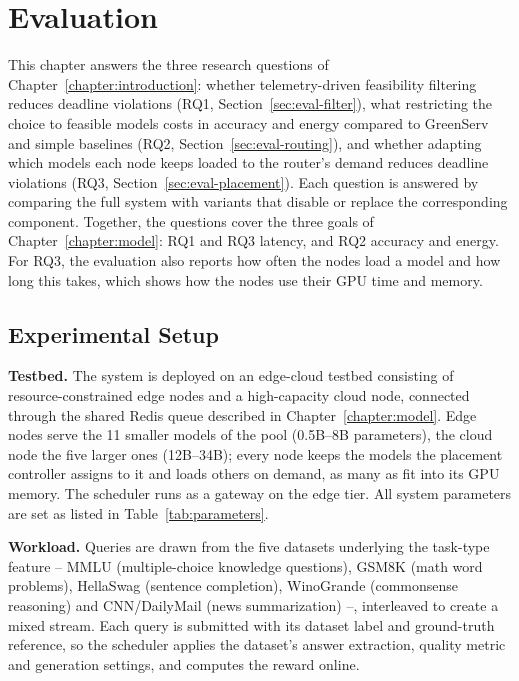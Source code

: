 \chapter{Evaluation}
\label{chapter:evaluation}


This chapter answers the three research questions of Chapter~\ref{chapter:introduction}: whether tele\-metry-driven feasibility filtering reduces deadline violations (RQ1, Section~\ref{sec:eval-filter}), what restricting the choice to feasible models costs in accuracy and energy compared to GreenServ and simple baselines (RQ2, Section~\ref{sec:eval-routing}), and whether adapting which models each node keeps loaded to the router's demand reduces deadline violations (RQ3, Section~\ref{sec:eval-placement}). Each question is answered by comparing the full system with variants that disable or replace the corresponding component. Together, the questions cover the three goals of Chapter~\ref{chapter:model}: RQ1 and RQ3 latency, and RQ2 accuracy and energy. For RQ3, the evaluation also reports how often the nodes load a model and how long this takes, which shows how the nodes use their GPU time and memory.

\section{Experimental Setup}

\textbf{Testbed.}
The system is deployed on an edge-cloud testbed consisting of resource-constrained edge nodes and a high-capacity cloud node, connected through the shared Redis queue described in Chapter~\ref{chapter:model}. Edge nodes serve the 11 smaller models of the pool (0.5B--8B parameters), the cloud node the five larger ones (12B--34B); every node keeps the models the placement controller assigns to it and loads others on demand, as many as fit into its GPU memory. The scheduler runs as a gateway on the edge tier. All system parameters are set as listed in Table~\ref{tab:parameters}.

\textbf{Workload.}
Queries are drawn from the five datasets underlying the task-type feature -- MMLU \cite{mmlu} (multiple-choice knowledge questions), GSM8K \cite{gsm8k} (math word problems), HellaSwag \cite{hellaswag} (sentence completion), WinoGrande \cite{winogrande} (commonsense reasoning) and CNN/DailyMail \cite{cnndm, see2017} (news summarization) --, interleaved to create a mixed stream. Each query is submitted with its dataset label and ground-truth reference, so the scheduler applies the dataset's answer extraction, quality metric and generation settings, and computes the reward online. %

